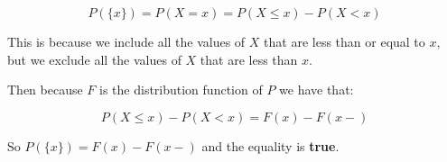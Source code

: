 \begin{equation}
    P(\{x\}) = P(X = x) = P(X \leq x) - P(X < x)
\end{equation}

\singlespacing

This is because we include all the values of $X$ that are less than or equal to $x$,
but we exclude all the values of $X$ that are less than $x$.

\singlespacing

Then because $F$ is the distribution function of $P$ we have that:

\singlespacing

\begin{equation}
    P(X \leq x) - P(X < x) = F(x) - F(x-)
\end{equation}

\singlespacing

So $P(\{x\}) = F(x) - F(x-)$ and the equality is \textbf{true}.
